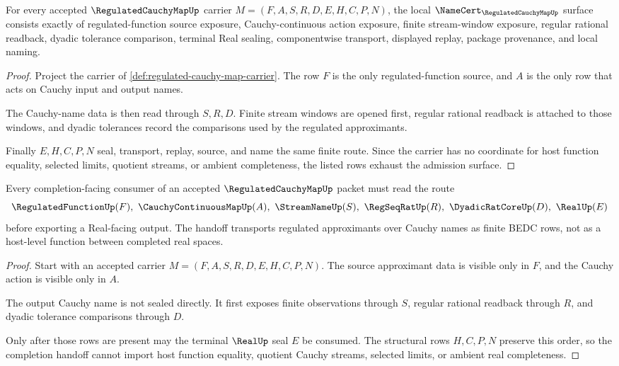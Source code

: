 \begin{theorem}
\label{thm:regulated-cauchy-map-carrier-admission}
For every accepted $\RegulatedCauchyMapUp$ carrier $M=(F,A,S,R,D,E,H,C,P,N)$, the local $\NameCert_{\RegulatedCauchyMapUp}$ surface consists exactly of regulated-function source exposure, Cauchy-continuous action exposure, finite stream-window exposure, regular rational readback, dyadic tolerance comparison, terminal Real sealing, componentwise transport, displayed replay, package provenance, and local naming.
\end{theorem}
\begin{proof}
Project the carrier of \autoref{def:regulated-cauchy-map-carrier}. The row $F$ is the only regulated-function source, and $A$ is the only row that acts on Cauchy input and output names.

The Cauchy-name data is then read through $S,R,D$. Finite stream windows are opened first, regular rational readback is attached to those windows, and dyadic tolerances record the comparisons used by the regulated approximants.

Finally $E,H,C,P,N$ seal, transport, replay, source, and name the same finite route. Since the carrier has no coordinate for host function equality, selected limits, quotient streams, or ambient completeness, the listed rows exhaust the admission surface.
\end{proof}

\begin{theorem}
\label{thm:regulated-cauchy-map-completion-handoff}
Every completion-facing consumer of an accepted $\RegulatedCauchyMapUp$ packet must read the route
$$
\RegulatedFunctionUp(F),\ \CauchyContinuousMapUp(A),\ \StreamNameUp(S),\ \RegSeqRatUp(R),\ \DyadicRatCoreUp(D),\ \RealUp(E)
$$
before exporting a Real-facing output. The handoff transports regulated approximants over Cauchy names as finite BEDC rows, not as a host-level function between completed real spaces.
\end{theorem}
\begin{proof}
Start with an accepted carrier $M=(F,A,S,R,D,E,H,C,P,N)$. The source approximant data is visible only in $F$, and the Cauchy action is visible only in $A$.

The output Cauchy name is not sealed directly. It first exposes finite observations through $S$, regular rational readback through $R$, and dyadic tolerance comparisons through $D$.

Only after those rows are present may the terminal $\RealUp$ seal $E$ be consumed. The structural rows $H,C,P,N$ preserve this order, so the completion handoff cannot import host function equality, quotient Cauchy streams, selected limits, or ambient real completeness.
\end{proof}

